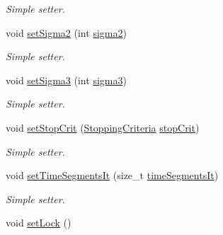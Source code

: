 \begin{DoxyCompactItemize}
\begin{DoxyCompactList}\small\item\em Simple setter. \end{DoxyCompactList}\item 
\hypertarget{classALNS__Parameters_a6c38e5e6504cb1347c6b7c975f60919a}{void \hyperlink{classALNS__Parameters_a6c38e5e6504cb1347c6b7c975f60919a}{set\-Sigma2} (int \hyperlink{classALNS__Parameters_a9ea8c0def481bbe0c2badb491ddb6149}{sigma2})}\label{classALNS__Parameters_a6c38e5e6504cb1347c6b7c975f60919a}

\begin{DoxyCompactList}\small\item\em Simple setter. \end{DoxyCompactList}\item 
\hypertarget{classALNS__Parameters_a027ba392cf1b842bb46d873c79707d38}{void \hyperlink{classALNS__Parameters_a027ba392cf1b842bb46d873c79707d38}{set\-Sigma3} (int \hyperlink{classALNS__Parameters_ad4e91eb974a8343a9cf968d44b38abcd}{sigma3})}\label{classALNS__Parameters_a027ba392cf1b842bb46d873c79707d38}

\begin{DoxyCompactList}\small\item\em Simple setter. \end{DoxyCompactList}\item 
\hypertarget{classALNS__Parameters_ad89288e31499105092007b1ee27bae8a}{void \hyperlink{classALNS__Parameters_ad89288e31499105092007b1ee27bae8a}{set\-Stop\-Crit} (\hyperlink{classALNS__Parameters_ae252d050b207dee5b442ca7d02c1d831}{Stopping\-Criteria} \hyperlink{classALNS__Parameters_a97f844a80a494b76d4d24dbb38c970c5}{stop\-Crit})}\label{classALNS__Parameters_ad89288e31499105092007b1ee27bae8a}

\begin{DoxyCompactList}\small\item\em Simple setter. \end{DoxyCompactList}\item 
\hypertarget{classALNS__Parameters_af921c76127e864203c18dbad04b30b07}{void \hyperlink{classALNS__Parameters_af921c76127e864203c18dbad04b30b07}{set\-Time\-Segments\-It} (size\-\_\-t \hyperlink{classALNS__Parameters_a748ba0be25197278911459d8777d4137}{time\-Segments\-It})}\label{classALNS__Parameters_af921c76127e864203c18dbad04b30b07}

\begin{DoxyCompactList}\small\item\em Simple setter. \end{DoxyCompactList}\item 
\hypertarget{classALNS__Parameters_af012ba5d865f36c0e05e784cf1e64305}{void \hyperlink{classALNS__Parameters_af012ba5d865f36c0e05e784cf1e64305}{set\-Lock} ()}\label{classALNS__Parameters_af012ba5d865f36c0e05e784cf1e64305}


\end{DoxyCompactItemize}
